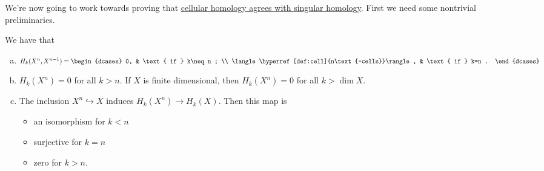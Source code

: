 We're now going to work towards proving that \hyperref[thm:cellular-homology-agrees-with-singular-homology]{cellular homology agrees with singular homology}. First we need some nontrivial preliminaries.

\begin{lemma}\label{lma:lec34}
	We have that
	\begin{enumerate}[(a)]
		\item\label{lma:lec34:a} \(H_k(X^n, X^{n - 1}) = \begin{dcases}
			      0,                                                   & \text{ if } k\neq n ; \\
			      \langle \hyperref[def:cell]{n\text{-cells}}\rangle , & \text{ if } k=n .
		      \end{dcases}\)
		\item\label{lma:lec34:b} \(H_k(X^n) = 0\) for all \(k > n\). If \(X\) is finite dimensional, then \(H_k(X^n) = 0\) for all \(k > \dim X\).
		\item\label{lma:lec34:c} The inclusion \(X^n \hookrightarrow X\) induces \(H_k(X^n) \to H_k(X)\). Then this map is
		      \begin{itemize}
			      \item an isomorphism for \(k < n\)
			      \item surjective for \(k = n\)
			      \item zero for \(k > n\).
		      \end{itemize}
	\end{enumerate}
\end{lemma}
